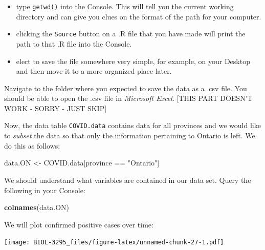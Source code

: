 \documentclass[]{book}
\newenvironment{Shaded}{\begin{snugshade}}{\end{snugshade}}
\newcommand{\KeywordTok}[1]{\textcolor[rgb]{0.13,0.29,0.53}{\textbf{{#1}}}}
\newcommand{\DataTypeTok}[1]{\textcolor[rgb]{0.13,0.29,0.53}{{#1}}}
\newcommand{\StringTok}[1]{\textcolor[rgb]{0.31,0.60,0.02}{{#1}}}
\newcommand{\NormalTok}[1]{{#1}}
\begin{document}
\begin{itemize}
\item
  type \texttt{getwd()} into the Console. This will tell you the current
  working directory and can give you clues on the format of the path for
  your computer.
\item
  clicking the \texttt{Source} button on a .R file that you have made
  will print the path to that .R file into the Console.
\item
  elect to save the file somewhere very simple, for example, on your
  Desktop and then move it to a more organized place later.
\end{itemize}

Navigate to the folder where you expected to save the data as a .csv
file. You should be able to open the .csv file in \emph{Microsoft
Excel}. {[}THIS PART DOESN'T WORK - SORRY - JUST SKIP{]}

Now, the data table \texttt{COVID.data} contains data for all provinces
and we would like to \emph{subset} the data so that only the information
pertaining to Ontario is left. We do this as follows:

\begin{Shaded}
\begin{Highlighting}[]
\NormalTok{data.ON <-}\StringTok{ }\NormalTok{COVID.data[province ==}\StringTok{ "Ontario"}\NormalTok{]}
\end{Highlighting}
\end{Shaded}

We should understand what variables are contained in our data set. Query
the following in your Console:

\begin{Shaded}
\begin{Highlighting}[]
\KeywordTok{colnames}\NormalTok{(data.ON)}
\end{Highlighting}
\end{Shaded}

We will plot confirmed positive cases over time:

\begin{Shaded}
\end{Shaded}

\texttt{[image: BIOL-3295\_files/figure-latex/unnamed-chunk-27-1.pdf]}
\end{document}
